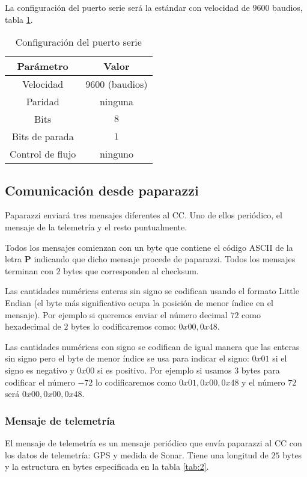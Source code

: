 La configuración del puerto serie será la estándar con velocidad de $9600$ baudios, tabla \ref{tab:1}.
\begin{table}[h]
	\centering
	\caption{Configuración del puerto serie}
\begin{tabular}{|c|c|}
	\hline
	\textbf{Parámetro} & \textbf{Valor} \\ \hline \hline
	Velocidad  & $9600$ (baudios) \\\hline 
	Paridad & ninguna  \\ \hline
	Bits & $8$ \\ \hline 
	Bits de parada & $1$  \\ \hline
	Control de flujo & ninguno \\ \hline
\end{tabular}
\label{tab:1}
\end{table}


\subsection{Comunicación desde paparazzi}

Paparazzi enviará tres mensajes diferentes al CC. Uno de ellos periódico, el mensaje de la telemetría y el resto puntualmente.

Todos los mensajes comienzan con un byte que contiene el código ASCII de la letra \textbf{P} indicando que dicho mensaje procede de paparazzi. Todos los mensajes terminan con $2$ bytes que corresponden al checksum.

Las cantidades numéricas enteras sin signo se codifican usando el formato Little Endian (el byte más significativo ocupa la posición de menor índice en el mensaje). Por ejemplo si queremos enviar el número decimal $72$ como hexadecimal de $2$ bytes lo codificaremos como: ${0x00,0x48}$.

Las cantidades numéricas con signo se codifican de igual manera que las enteras sin signo pero el byte de menor índice se usa para indicar el signo: $0x01$ si el signo es negativo y $0x00$ si es positivo. Por ejemplo si usamos $3$ bytes para codificar el número $-72$ lo codificaremos como ${0x01,0x00,0x48}$ y el número $72$ será ${0x00,0x00,0x48}$.

\subsubsection{Mensaje de telemetría}

El mensaje de telemetría es un mensaje periódico que envía paparazzi al CC con los datos de telemetría: GPS y medida de Sonar. Tiene una longitud de $25$ bytes y la estructura en bytes especificada en la tabla \ref{tab:2}.

